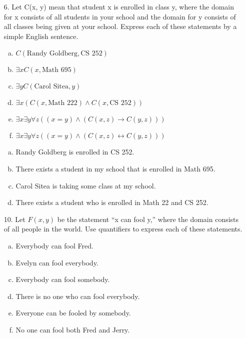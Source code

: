 \begin{itemize}
    \item[6.] Let C(x, y) mean that student x is enrolled in class y,
          where the domain for x consists of all students in your school and
          the domain for y consists of all classes being given at your school.
          Express each of these statements by a simple English sentence.
          \begin{enumerate}[a.]
              \item $C(\text{Randy Goldberg}, \text{CS } 252)$
              \item $\exists xC(x, \text{Math } 695)$
              \item $\exists yC(\text{Carol Sitea}, y)$
              \item $\exists x(C(x, \text{Math } 222) \land C(x, \text{CS } 252))$
              \item $\exists x \exists y \forall z ((x = y) \land (C(x, z) \to C(y, z)))$
              \item $\exists x \exists y \forall z ((x = y) \land (C(x, z) \leftrightarrow C(y, z)))$
          \end{enumerate}
          \answer
          \begin{enumerate}[a.]
              \item Randy Goldberg is enrolled in CS 252.
              \item There exists a student in my school that is enrolled in Math 695.
              \item Carol Sitea is taking some class at my school.
              \item There exists a student who is enrolled in Math 22 and CS 252.
          \end{enumerate}
    \item[10.] Let $F(x, y)$ be the statement “x can fool y,” where the domain consists of
          all people in the world. Use quantifiers to express each of these statements.
          \begin{enumerate}[a.]
              \item Everybody can fool Fred.
              \item Evelyn can fool everybody.
              \item Everybody can fool somebody.
              \item There is no one who can fool everybody.
              \item Everyone can be fooled by somebody.
              \item No one can fool both Fred and Jerry.

\end{enumerate}
\end{itemize}
